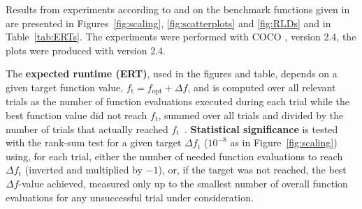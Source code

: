 \documentclass[sigconf]{acmart}
\newcommand{\Df}{\ensuremath{\Delta f}}
\newcommand{\fopt}{\ensuremath{f_\mathrm{opt}}}
\newcommand{\ftarget}{\ensuremath{f_\mathrm{t}}}
\newcommand{\change}[1]{{\color{red} #1}}
\begin{document}
Results from experiments according to \cite{hansen2016exp} and \cite{hansen2016perfass} on the benchmark
functions given in \cite{wp200901_2010,hansen2010fun} are presented in
Figures~\ref{fig:scaling}, \ref{fig:scatterplots} and \ref{fig:RLDs} and
in Table~\ref{tab:ERTs}. The experiments were performed with COCO \cite{hansen2020cocoplat},
version \change{2.4}, the plots were produced with version \change{2.4}.

The \textbf{expected runtime (ERT)}, used in the figures and table, depends on a
given target function value, $\ftarget=\fopt+\Df$, and is computed over all relevant trials
as the number of function evaluations executed during each trial while the best
function value did not reach \ftarget, summed over all trials
and divided by the number of trials that actually reached \ftarget\
\cite{hansen2010exp,price1997dev}.
\textbf{Statistical significance} is tested with the rank-sum test for a given
target $\Delta\ftarget$ ($10^{-8}$ as in Figure~\ref{fig:scaling}) using,
for each trial, either the number of needed function evaluations to reach
$\Delta\ftarget$ (inverted and multiplied by $-1$), or, if the target was not
reached, the best $\Df$-value achieved, measured only up to the smallest number
of overall function evaluations for any unsuccessful trial under consideration.



\end{document}

